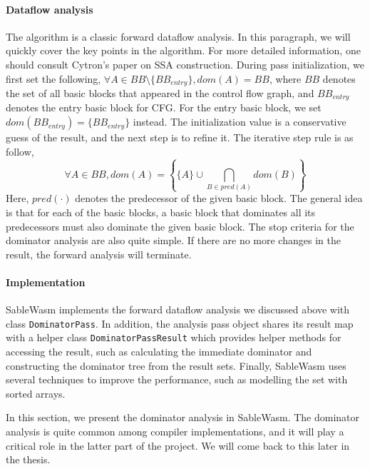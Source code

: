 \paragraph{Dataflow analysis}
The algorithm is a classic forward dataflow analysis. In this paragraph, we will quickly cover the key points in the algorithm. For more detailed information, one should consult Cytron's paper on SSA construction. During pass initialization, we first set the following, $\forall A \in BB \setminus \{ BB_{entry} \}, dom(A) = BB$, where $BB$ denotes the set of all basic blocks that appeared in the control flow graph, and $BB_{entry}$ denotes the entry basic block for CFG. For the entry basic block, we set $dom(BB_{entry}) = \{ BB_{entry} \}$ instead. The initialization value is a conservative guess of the result, and the next step is to refine it. The iterative step rule is as follow,
$$
    \forall A \in BB, dom(A) = \left\{\{ A \} \cup \bigcap_{B \in pred(A)} dom(B)\right\}
$$
Here, $pred(\cdot)$ denotes the predecessor of the given basic block. The general idea is that for each of the basic blocks, a basic block that dominates all its predecessors must also dominate the given basic block. The stop criteria for the dominator analysis are also quite simple. If there are no more changes in the result, the forward analysis will terminate.

\paragraph{Implementation}
SableWasm implements the forward dataflow analysis we discussed above with class \texttt{DominatorPass}. In addition, the analysis pass object shares its result map with a helper class \texttt{DominatorPassResult} which provides helper methods for accessing the result, such as calculating the immediate dominator and constructing the dominator tree from the result sets. Finally, SableWasm uses several techniques to improve the performance, such as modelling the set with sorted arrays.

In this section, we present the dominator analysis in SableWasm. The dominator analysis is quite common among compiler implementations, and it will play a critical role in the latter part of the project. We will come back to this later in the thesis.